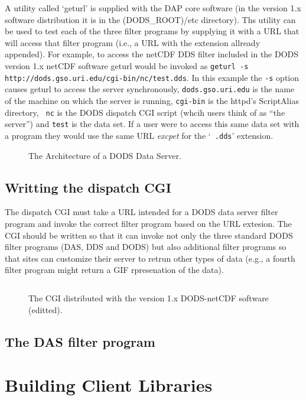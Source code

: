 A utility called `geturl' is supplied with the DAP core software (in the
version 1.x software distribution it is in the \dollar(DODS_ROOT)/etc
directory). Ths utility can be used to test each of the three filter programs
by supplying it with a URL that will access that filter program (i.e., a URL
with the extension allready appended). For example, to access the netCDF DDS
filter included in the DODS version 1.x netCDF software geturl would be
invoked as {\tt geturl -s http://dods.gso.uri.edu/cgi-bin/nc/test.dds}. In
this example the {\tt -s} option causes geturl to access the server
synchronously, {\tt dods.gso.uri.edu} is the name of the machine on which the
server is running, {\tt cgi-bin} is the httpd's ScriptAlias directory, {\tt
nc} is the DODS dispatch CGI script (whcih users think of as ``the server'')
and {\tt test} is the data set. If a user were to access this same data set
with a program they would use the same URL {\em excpet\/} for the `{\tt
.dds}' extension.

\begin{figure}
\label{toolkits:server-design}
\caption{The Architecture of a DODS Data Server.}
\end{figure}

\subsection{Writting the dispatch CGI}

The dispatch CGI must take a URL intended for a DODS data server filter
program and invoke the correct filter program based on the URL extesion. The
CGI should be written so that it can invoke not only the three standard DODS
filter programs (DAS, DDS and DODS) but also additional filter programs so
that sites can customize their server to retrun other types of data (e.g., a
fourth filter program might return a GIF rpresenation of the data).

\begin{figure}
\label{toolkits:cgi}
\begin{verbatim}

\end{verbatim}
\caption{The CGI distributed with the version 1.x DODS-netCDF software
(editted).}
\end{figure}

\subsection{The DAS filter program}  

\section{Building Client Libraries}
\label{toolkits:clients}
